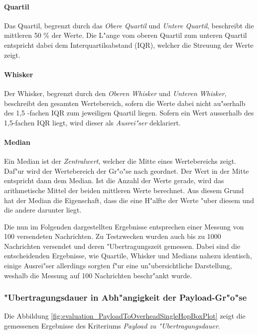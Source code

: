 
\paragraph{Quartil}
Das Quartil, begrenzt durch das \emph{Obere Quartil} und \emph{Untere Quartil}, beschreibt die mittleren 50 \% der Werte. Die L"ange vom oberen Quartil zum unteren Quartil entspricht dabei dem Interquartilsabstand (IQR), welcher die Streuung der Werte zeigt.
\paragraph{Whisker}
Der Whisker, begrenzt durch den \emph{Oberen Whisker} und \emph{Unteren Whisker}, beschreibt den gesamten Wertebereich, sofern die Werte dabei nicht au"serhalb des 1,5 -fachen IQR zum jeweiligen Quartil liegen. Sofern ein Wert ausserhalb des 1,5-fachen IQR liegt, wird dieser als \emph{Ausrei"ser} deklariert.
\paragraph{Median}
Ein Median ist der \emph{Zentralwert}, welcher die Mitte eines Wertebereichs zeigt. Daf"ur wird der Wertebereich der Gr"o"se nach geordnet. Der Wert in der Mitte entspricht dann dem Median. Ist die Anzahl der Werte gerade, wird das arithmetische Mittel der beiden mittleren Werte berechnet. Aus diesem Grund hat der Median die Eigenschaft, dass die eine H"alfte der Werte "uber diesem und die andere darunter liegt.

Die nun im Folgenden dargestellten Ergebnisse entsprechen einer Messung von 100 versendeten Nachrichten. Zu Testzwecken wurden auch bis zu 1000 Nachrichten versendet und deren "Ubertragungszeit gemessen. Dabei sind die entscheidenden Ergebnisse, wie Quartile, Whisker und Medians nahezu identisch, einige Ausrei"ser allerdings sorgten f"ur eine un"ubersichtliche Darstellung, weshalb die Messung auf 100 Nachrichten beschr"ankt wurde.

\subsubsection{"Ubertragungsdauer in Abh"angigkeit der Payload-Gr"o"se}


Die Abbildung \ref{fig:evaluation_PayloadToOverheadSingleHopBoxPlot} zeigt die gemessenen Ergebnisse des Kriteriums \emph{Payload zu "Ubertragungsdauer}.

